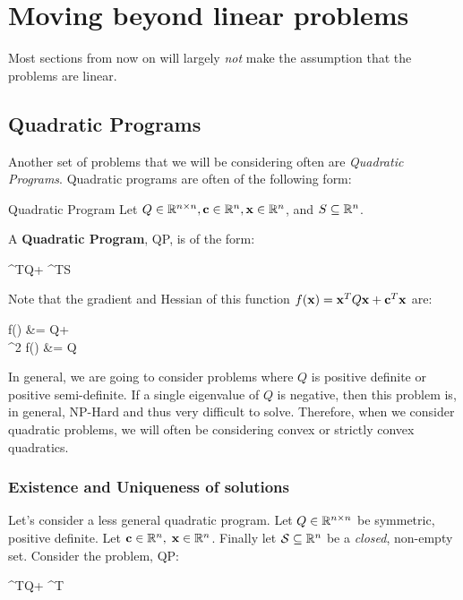 \pagebreak
\section{Moving beyond linear problems}

Most sections from now on will largely 
\textit{not} make the assumption that the problems are linear.

\subsection{Quadratic Programs}

Another set of problems that we will be considering often are \textit{Quadratic
Programs}. Quadratic programs are often of the following form:

\begin{defn}{Quadratic Program}{}
	Let $Q \in \mathbb{R}^{n \times n}, \mathbf{c} \in \mathbb{R}^n, \mathbf{x} \in \mathbb{R}^n$, and
	$S \subseteq \mathbb{R}^n$.

	\medskip
	A \textbf{Quadratic Program}, QP, is of the form:
	\begin{frml}
		\min \vx^TQ\vx + \vc^T\vx \st \vx \in S
	\end{frml}
\end{defn}

Note that the gradient and Hessian of this function $f(\mathbf{x}) = \mathbf{x}^TQ\mathbf{x} + \mathbf{c}^T\mathbf{x}$ are: 

\begin{frml}
	\nabla f(\vx) &= Q\vx + \vc \\
	\nabla^2 f(\vx) &= Q
\end{frml}

In general, we are going to consider problems where $Q$ is positive definite or
positive semi-definite. If a single eigenvalue of $Q$ is negative, then this 
problem is, in general, NP-Hard and thus very difficult to solve. Therefore, 
when we consider quadratic problems, we will often be considering convex or 
strictly convex quadratics.

\subsubsection{Existence and Uniqueness of solutions}

Let's consider a less general quadratic program. Let $Q \in \mathbb{R}^{n\times n}$ be
symmetric, positive definite. Let $\mathbf{c} \in \mathbb{R}^n, \; \mathbf{x} \in \mathbb{R}^n$.
Finally let $\mathcal{S}\subseteq \mathbb{R}^n$ be a \textit{closed}, non-empty set.
Consider the problem, QP:
\begin{frml}
	\min \vx^TQ\vx + \vc^T\vx \st \vx \in {}
\end{frml}

